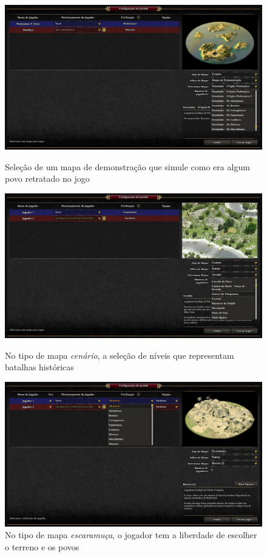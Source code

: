 \documentclass[article,11pt, a4paper,sumario=tradicional]{abntex2}
\begin{document}
		\begin{figure}
			\centering
			\includegraphics[width=0.9\linewidth]{screenshots_0ad/screenshot0009}
			\caption[]{Seleção de um mapa de demonstração que simule como era algum povo retratado no jogo}
			\label{fig:screenshot0009}
			
			\includegraphics[width=0.9\linewidth]{screenshots_0ad/screenshot0010}
			\caption{No tipo de mapa \textit{cenário}, a seleção de níveis que representam batalhas históricas}
			\label{fig:screenshot0010}
			
			\includegraphics[width=0.9\linewidth]{screenshots_0ad/screenshot0011}
			\caption[]{No tipo de mapa \textit{escaramuça}, o jogador tem a liberdade de escolher o terreno e os povos}
			\label{fig:screenshot0011}
			
		\end{figure}
\end{document}

